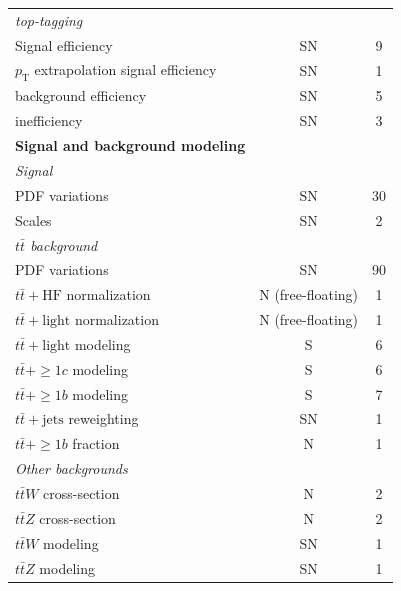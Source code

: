 \begin{longtable}[hp]{lcc}
    \hline
    \textit{top-tagging} & &\\
    \multicolumn{1}{l}{Signal efficiency}                            & SN &  9\\
    \multicolumn{1}{l}{$p_\text{T}$ extrapolation signal efficiency} & SN &  1\\
    \multicolumn{1}{l}{background efficiency}                        & SN &  5\\
    \multicolumn{1}{l}{inefficiency}                                 & SN &  3\\
    \hline
    \textbf{Signal and background modeling} & &\\
    \hline
    \textit{Signal} & &\\
    \multicolumn{1}{l}{PDF variations} & SN & 30\\
    \multicolumn{1}{l}{Scales}         & SN &  2\\
    \hline
    \textit{$t\bar{t}$ background} & &\\
    \multicolumn{1}{l}{PDF variations}                                        & SN                & 90\\
    \multicolumn{1}{l}{$t\bar{t}+\text{HF}$ normalization}                    & N (free-floating) &  1\\
    \multicolumn{1}{l}{$t\bar{t}+\text{light}$ normalization}                 & N (free-floating) &  1\\
    \multicolumn{1}{l}{$t\bar{t}+\text{light}$ modeling}                      & S                 &  6\\
    \multicolumn{1}{l}{$t\bar{t}+\geq1c$ modeling}                            & S                 &  6\\
    \multicolumn{1}{l}{$t\bar{t}+\geq1b$ modeling}                            & S                 &  7\\
    \multicolumn{1}{l}{$t\bar{t}+\text{jets}$ reweighting}                    & SN                &  1\\
    \multicolumn{1}{l}{$t\bar{t}+\geq1b$ fraction}                            & N                 &  1\\
    \hline
    \textit{Other backgrounds} & &\\
    \multicolumn{1}{l}{$t\bar{t}W$ cross-section}        & N  & 2\\
    \multicolumn{1}{l}{$t\bar{t}Z$ cross-section}        & N  & 2\\
    \multicolumn{1}{l}{$t\bar{t}W$ modeling}            & SN & 1\\
    \multicolumn{1}{l}{$t\bar{t}Z$ modeling}            & SN & 1\\

\end{longtable}
